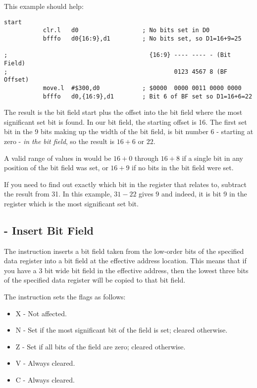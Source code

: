 This example should help:

\begin{lstlisting}[firstnumber=1,caption={Example of the BFFFO Instruction}]
start
           clr.l   d0                  ; No bits set in D0
           bfffo   d0{16:9},d1         ; No bits set, so D1=16+9=25

;                                        {16:9} ---- ---- - (Bit Field)
;                                               0123 4567 8 (BF Offset)
           move.l  #$300,d0            ; $0000  0000 0011 0000 0000 
           bfffo   d0,{16:9},d1        ; Bit 6 of BF set so D1=16+6=22
\end{lstlisting}

The result is the bit field start plus the offset into the bit field where the most significant set bit is found. In our bit field, the starting offset is 16. The first set bit in the 9 bits making up the width of the bit field, is bit number 6 - starting at zero - \emph{in the bit field}, so the result is $16 + 6$ or $22$.

A valid range of values in  would be $16+0$ through $16+8$ if a single bit in any position of the bit field was set, or $16+9$ if no bits in the bit field were set.

If you need to find out exactly which bit in the register that relates to, subtract the result from 31. In this example, $31-22$ gives $9$ and indeed, it is bit 9 in the register which is the most significant set bit.

\subsection{ - Insert Bit Field}

The  instruction inserts a bit field taken from the low-order bits of the specified data register into a bit field at the effective address location. This means that if you have a 3 bit wide bit field in the effective address, then the lowest three bits of the specified data register will be copied to that bit field.

The instruction sets the flags as follows:

\begin{itemize}
    \item X - Not affected.
    \item N - Set if the most significant bit of the field is set; cleared otherwise.
    \item Z - Set if all bits of the field are zero; cleared otherwise.
    \item V - Always cleared.
    \item C - Always cleared.
\end{itemize}

